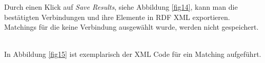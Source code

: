 		\pagebreak[4]
		
		Durch einen Klick auf \textit{Save Results}, siehe Abbildung \ref{fig14}, kann
		man die bestätigten Verbindungen und ihre Elemente in RDF XML exportieren. Matchings für die keine
		Verbindung ausgewählt wurde, werden nicht gespeichert.\\
		\begin{minipage}{\linewidth}
			\label{fig14}  
		\end{minipage}
		\\
		In Abbildung \ref{fig15} ist exemplarisch der XML Code für ein Matching
		aufgeführt.\\
		\begin{minipage}{\linewidth}
			\label{fig15}  
		\end{minipage}
		
		\pagebreak[4]
		
